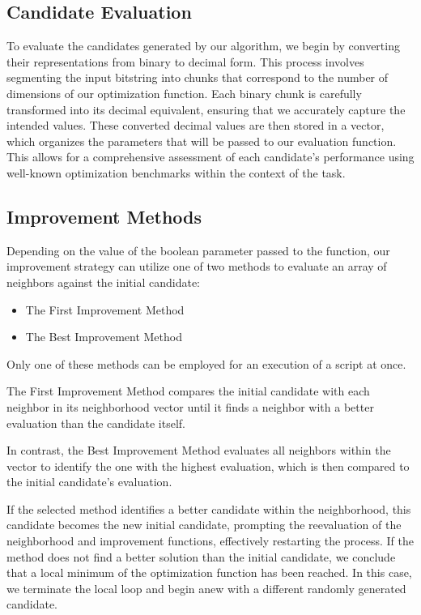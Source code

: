 \documentclass{article}
\begin{document}
\subsection{Candidate Evaluation}
To evaluate the candidates generated by our algorithm, we begin by converting their representations from binary to decimal form. This process involves segmenting the input bitstring into chunks that correspond to the number of dimensions of our optimization function. Each binary chunk is carefully transformed into its decimal equivalent, ensuring that we accurately capture the intended values. These converted decimal values are then stored in a vector, which organizes the parameters that will be passed to our evaluation function. This allows for a comprehensive assessment of each candidate’s performance using well-known optimization benchmarks within the context of the task.


\subsection{Improvement Methods}
Depending on the value of the boolean parameter passed to the function, our improvement strategy can utilize one of two methods to evaluate an array of neighbors against the initial candidate:

\begin{itemize} 
	\item The First Improvement Method 
	\item The Best Improvement Method 
\end{itemize}

Only one of these methods can be employed for an execution of a script at once.
 
The First Improvement Method compares the initial candidate with each neighbor in its neighborhood vector until it finds a neighbor with a better evaluation than the candidate itself.

In contrast, the Best Improvement Method evaluates all neighbors within the vector to identify the one with the highest evaluation, which is then compared to the initial candidate's evaluation.

If the selected method identifies a better candidate within the neighborhood, this candidate becomes the new initial candidate, prompting the reevaluation of the neighborhood and improvement functions, effectively restarting the process. If the method does not find a better solution than the initial candidate, we conclude that a local minimum of the optimization function has been reached. In this case, we terminate the local loop and begin anew with a different randomly generated candidate.
\end{document}
